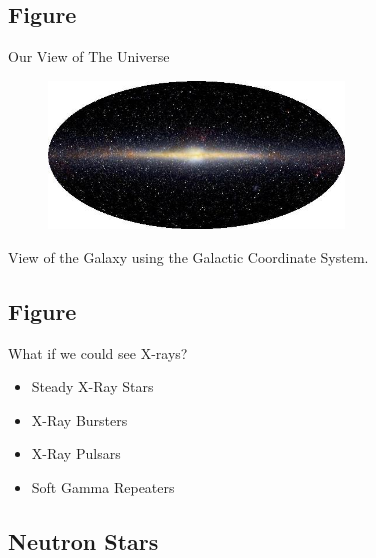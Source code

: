 \documentclass[12pt, aspectratio=169]{beamer}
\begin{document}
\subsection{Figure}

\begin{frame}{Our View of The Universe}
  
\begin{figure}
\includegraphics[width=0.7\textwidth]{Optical_light.jpg}
\end{figure}
\centering
View of the Galaxy using the Galactic Coordinate System.
\end{frame}

\subsection{Figure}
\begin{frame}{What if we could see X-rays?}
  
 \begin{itemize}
  \item Steady X-Ray Stars
  \item X-Ray Bursters
  \item X-Ray Pulsars
  \item Soft Gamma Repeaters
 \end{itemize}
\end{frame}


\subsection{Neutron Stars}
\end{document}
